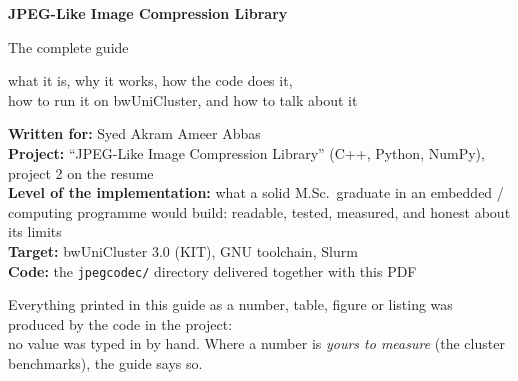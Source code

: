 \documentclass[11pt,a4paper]{report}
\DeclareRobustCommand{\_}{\textunderscore\allowbreak{}}
\newcommand{\file}[1]{\texttt{#1}}
\begin{document}
\begin{titlepage}
\centering
\vspace*{2.2cm}
{\Huge\bfseries\color{accent} JPEG-Like Image Compression Library\par}
\vspace{0.4cm}
{\LARGE The complete guide\par}
\vspace{0.8cm}
{\large what it is, why it works, how the code does it,\\ how to run it on bwUniCluster, and how to talk about it\par}
\vspace{1.6cm}
\begin{tcolorbox}[colback=plainbg,colframe=accent,width=0.82\textwidth,boxrule=0.5pt]
\raggedright
\textbf{Written for:} Syed Akram Ameer Abbas\\
\textbf{Project:} ``JPEG-Like Image Compression Library'' (C++, Python, NumPy), project 2 on the resume\\
\textbf{Level of the implementation:} what a solid M.Sc.\ graduate in an embedded / computing programme would build: readable, tested, measured, and honest about its limits\\
\textbf{Target:} bwUniCluster 3.0 (KIT), GNU toolchain, Slurm\\
\textbf{Code:} the \file{jpeg\_codec/} directory delivered together with this PDF
\end{tcolorbox}
\vfill
{\small Everything printed in this guide as a number, table, figure or listing was produced by the code in the project:\\
no value was typed in by hand. Where a number is \emph{yours to measure} (the cluster benchmarks), the guide says so.\par}
\end{titlepage}

\tableofcontents

















\appendix

\end{document}
